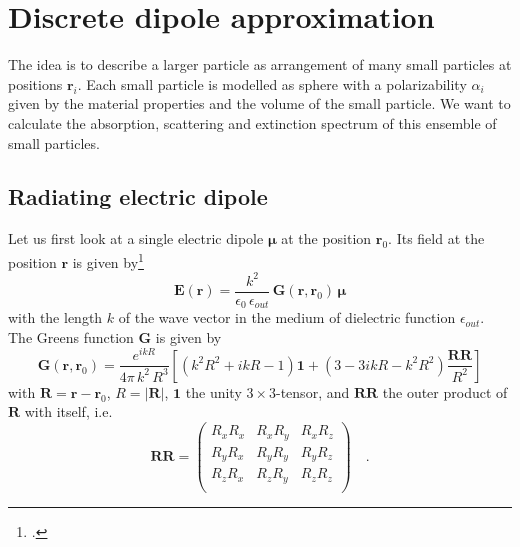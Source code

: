 


\chapter{Discrete dipole approximation}


The idea is to describe a larger particle as arrangement of many small particles at positions $\mathbf{r}_i$.
Each small particle is modelled as sphere  with a  polarizability $\alpha_i$ given by the material properties and the volume of the small particle. We want to calculate the absorption, scattering and extinction spectrum of this  ensemble of small particles.


\section{Radiating electric dipole}

Let us first look at a single electric dipole $\mathbf{\mu}$ at the position $\mathbf{r}_0$. Its field at the position $\mathbf{r}$ is given by\footcite[eq. 8.52]{Novotny-Hecht2012} 
\begin{equation}
\mathbf{E}(\mathbf{r}) = \frac{k^2}{\epsilon_0 \, \epsilon_{out}} \, \mathbf{G}(\mathbf{r}, \mathbf{r}_0) \,  \mathbf{\mu}
\end{equation}
with the length $k$ of the wave vector in the medium of dielectric function $\epsilon_{out}$.
The Greens function $\mathbf{G}$ is given by
\begin{equation}
\mathbf{G}(\mathbf{r}, \mathbf{r}_0) = \frac{e^{i k R} }{4 \pi \, k^2 \, R^3 } 
\left[  
 \left( k^2 R^2 + i k R  - 1 \right) \mathbf{1}  +    
  \left( 3 - 3 i k R - k^2 R^2  \right) \frac{\mathbf{RR}}{R^2}   
  \right]
\end{equation}
with $\mathbf{R} = \mathbf{r} - \mathbf{r}_0$, $R = |\mathbf{R}|$, $\mathbf{1}$ the unity $3 \times 3$-tensor, and $\mathbf{RR}$ the outer product of $\mathbf{R}$ with itself, i.e.
\begin{equation}
\mathbf{RR} = 
\begin{pmatrix}
R_x R_x &  R_x R_y & R_x R_z \\
R_y R_x &  R_y R_y & R_y R_z \\
R_z R_x &  R_z R_y & R_z R_z \\
\end{pmatrix} \quad .
\end{equation}


